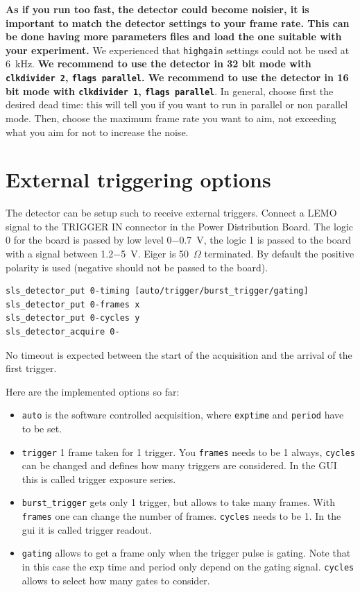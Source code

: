 \documentclass{article}
\begin{document}
\textbf{As if you run too fast, the detector could become noisier, it is important to match the detector settings to your frame rate. This can be done having more parameters files and load the one suitable with your experiment.} We experienced that {\tt{highgain}} settings could not be used at 6~kHz.
\textbf{We recommend to use the detector in 32 bit mode with {\tt{clkdivider 2}}, {\tt{flags parallel}}. We recommend to use the detector in 16 bit mode with {\tt{clkdivider 1}}, {\tt{flags parallel}}}. In general, choose first the desired dead time: this will tell you if you want to run in parallel or non parallel mode. Then, choose the maximum frame rate you want to aim, not exceeding what you aim for not to increase the noise.


\section{External triggering options}
The detector can be setup such to receive external triggers. Connect a LEMO signal to the TRIGGER IN connector in the Power Distribution Board. The logic 0 for the board is passed by low level 0$-$0.7~V, the logic 1 is passed to the board with a signal between 1.2$-$5~V. Eiger is 50~$\Omega$ terminated. By default the positive polarity is used (negative should not be passed to the board).  
\begin{verbatim}
sls_detector_put 0-timing [auto/trigger/burst_trigger/gating]
sls_detector_put 0-frames x
sls_detector_put 0-cycles y
sls_detector_acquire 0-
\end{verbatim}
No timeout is expected between the start of the acquisition and the arrival of the first trigger. 

Here are the implemented options so far:
\begin{itemize}
\item {\tt{auto}} is the software controlled acquisition, where {\tt{exptime}} and {\tt{period}} have to be set.
\item {\tt{trigger}} 1 frame taken for 1 trigger. You {\tt{frames}} needs to be  1 always, {\tt{cycles}} can be changed and defines how many triggers are considered. In the GUI this is called trigger exposure series. 
\item {\tt{burst\_trigger}} gets only 1 trigger, but allows to take many frames. With {\tt{frames}} one can change the number of frames. {\tt{cycles}} needs to be 1. In the gui it is called trigger readout.
\item{\tt{gating}} allows to get a frame only when the trigger pulse is gating. Note that in this case the exp time and period only depend on the gating signal. {\tt{cycles}} allows to select how many gates to consider. 
\end{itemize}
\end{document}

